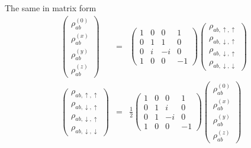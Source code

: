 \documentclass[11pt,a4paper]{report}
\begin{document}
The same in matrix form 
\begin{eqnarray}
\left(\begin{array}{c}
\rho_{ab}^{(0)}\\\rho_{ab}^{(x)}\\\rho_{ab}^{(y)}\\\rho_{ab}^{(z)}
\end{array}\right)
&=&
\left(\begin{array}{cccc}
1&0&0&1\\0&1&1&0\\0&i&-i&0\\1&0&0&-1
\end{array}\right)
\left(\begin{array}{c}
\rho_{ab,\uparrow,\uparrow}\\\rho_{ab,\downarrow,\uparrow}\\\rho_{ab,\downarrow,\uparrow}\\\rho_{ab,\downarrow,\downarrow}\end{array}\right)
\nonumber\\
\left(\begin{array}{c}
\rho_{ab,\uparrow,\uparrow}\\\rho_{ab,\downarrow,\uparrow}\\\rho_{ab,\downarrow,\uparrow}\\\rho_{ab,\downarrow,\downarrow}\end{array}\right)
&=&
\frac{1}{2}\left(\begin{array}{cccc}
1&0&0&1\\0&1&i&0\\0&1&-i&0\\1&0&0&-1
\end{array}\right)
\left(\begin{array}{c}
\rho_{ab}^{(0)}\\\rho_{ab}^{(x)}\\\rho_{ab}^{(y)}\\\rho_{ab}^{(z)}
\end{array}\right)
\end{eqnarray}



\end{document}
